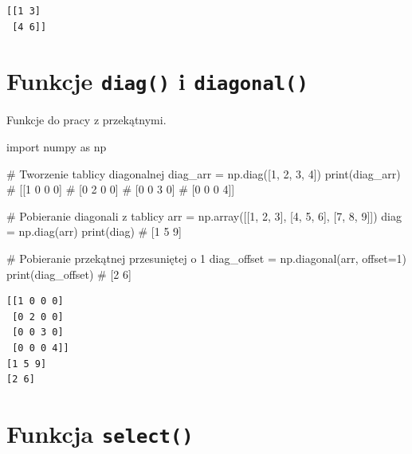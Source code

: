 \documentclass[
  polish,
  letterpaper,
  DIV=11,
  numbers=noendperiod]{scrreprt}
\newenvironment{Shaded}{\begin{snugshade}}{\end{snugshade}}
\newcommand{\BuiltInTok}[1]{\textcolor[rgb]{0.00,0.23,0.31}{#1}}
\newcommand{\CommentTok}[1]{\textcolor[rgb]{0.37,0.37,0.37}{#1}}
\newcommand{\DecValTok}[1]{\textcolor[rgb]{0.68,0.00,0.00}{#1}}
\newcommand{\ImportTok}[1]{\textcolor[rgb]{0.00,0.46,0.62}{#1}}
\newcommand{\NormalTok}[1]{\textcolor[rgb]{0.00,0.23,0.31}{#1}}
\newcommand{\OperatorTok}[1]{\textcolor[rgb]{0.37,0.37,0.37}{#1}}
\begin{document}
\begin{verbatim}
[[1 3]
 [4 6]]
\end{verbatim}

\section{\texorpdfstring{Funkcje \texttt{diag()} i
\texttt{diagonal()}}{Funkcje diag() i diagonal()}}\label{funkcje-diag-i-diagonal}

Funkcje do pracy z przekątnymi.

\begin{Shaded}
\begin{Highlighting}[]
\ImportTok{import}\NormalTok{ numpy }\ImportTok{as}\NormalTok{ np}

\CommentTok{\# Tworzenie tablicy diagonalnej}
\NormalTok{diag\_arr }\OperatorTok{=}\NormalTok{ np.diag([}\DecValTok{1}\NormalTok{, }\DecValTok{2}\NormalTok{, }\DecValTok{3}\NormalTok{, }\DecValTok{4}\NormalTok{])}
\BuiltInTok{print}\NormalTok{(diag\_arr)}
\CommentTok{\# [[1 0 0 0]}
\CommentTok{\#  [0 2 0 0]}
\CommentTok{\#  [0 0 3 0]}
\CommentTok{\#  [0 0 0 4]]}

\CommentTok{\# Pobieranie diagonali z tablicy}
\NormalTok{arr }\OperatorTok{=}\NormalTok{ np.array([[}\DecValTok{1}\NormalTok{, }\DecValTok{2}\NormalTok{, }\DecValTok{3}\NormalTok{], [}\DecValTok{4}\NormalTok{, }\DecValTok{5}\NormalTok{, }\DecValTok{6}\NormalTok{], [}\DecValTok{7}\NormalTok{, }\DecValTok{8}\NormalTok{, }\DecValTok{9}\NormalTok{]])}
\NormalTok{diag }\OperatorTok{=}\NormalTok{ np.diag(arr)}
\BuiltInTok{print}\NormalTok{(diag)  }\CommentTok{\# [1 5 9]}

\CommentTok{\# Pobieranie przekątnej przesuniętej o 1}
\NormalTok{diag\_offset }\OperatorTok{=}\NormalTok{ np.diagonal(arr, offset}\OperatorTok{=}\DecValTok{1}\NormalTok{)}
\BuiltInTok{print}\NormalTok{(diag\_offset)  }\CommentTok{\# [2 6]}
\end{Highlighting}
\end{Shaded}

\begin{verbatim}
[[1 0 0 0]
 [0 2 0 0]
 [0 0 3 0]
 [0 0 0 4]]
[1 5 9]
[2 6]
\end{verbatim}

\section{\texorpdfstring{Funkcja
\texttt{select()}}{Funkcja select()}}\label{funkcja-select}
\end{document}
